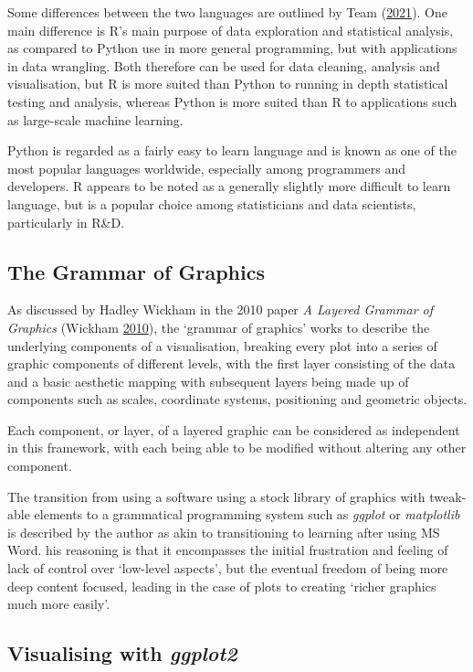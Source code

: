 \documentclass[
  11pt,
]{book}
\begin{document}
Some differences between the two languages are outlined by Team
(\protect\hyperlink{ref-rvpy}{2021}). One main difference is R's main
purpose of data exploration and statistical analysis, as compared to
Python use in more general programming, but with applications in data
wrangling. Both therefore can be used for data cleaning, analysis and
visualisation, but R is more suited than Python to running in depth
statistical testing and analysis, whereas Python is more suited than R
to applications such as large-scale machine learning.

Python is regarded as a fairly easy to learn language and is known as
one of the most popular languages worldwide, especially among
programmers and developers. R appears to be noted as a generally
slightly more difficult to learn language, but is a popular choice among
statisticians and data scientists, particularly in R\&D.

\subsection{The Grammar of Graphics}

As discussed by Hadley Wickham in the 2010 paper
\textit{A Layered Grammar of Graphics} (Wickham
\protect\hyperlink{ref-layered-grammar}{2010}), the `grammar of
graphics' works to describe the underlying components of a
visualisation, breaking every plot into a series of graphic components
of different levels, with the first layer consisting of the data and a
basic aesthetic mapping with subsequent layers being made up of
components such as scales, coordinate systems, positioning and geometric
objects.

Each component, or layer, of a layered graphic can be considered as
independent in this framework, with each being able to be modified
without altering any other component.

The transition from using a software using a stock library of graphics
with tweak-able elements to a grammatical programming system such as
\textit{ggplot} or \textit{matplotlib} is described by the author as
akin to transitioning to learning \latex after using MS Word. his
reasoning is that it encompasses the initial frustration and feeling of
lack of control over `low-level aspects', but the eventual freedom of
being more deep content focused, leading in the case of plots to
creating `richer graphics much more easily'.

\subsection{Visualising with \textit{ggplot2}}
\end{document}
